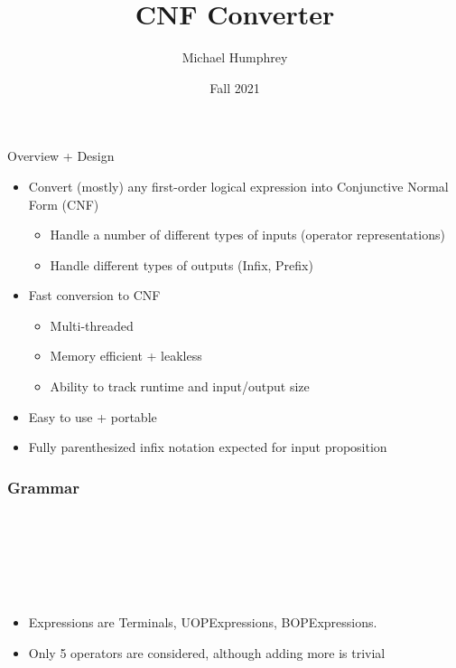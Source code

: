 \documentclass{beamer}
\title{CNF Converter}
\author{Michael Humphrey}
\institute{Colorado School of Mines}
\date{Fall 2021}
\begin{document}
\frame{\titlepage}

\begin{frame}{Overview + Design}
    \begin{itemize}
        \setlength\itemsep{1em}
        \item Convert (mostly) any first-order logical expression into Conjunctive Normal Form (CNF)
        \begin{itemize}
            \item Handle a number of different types of inputs (operator representations)
            \item Handle different types of outputs (Infix, Prefix)\\
        \end{itemize}   
        \item Fast conversion to CNF
        \begin{itemize}
            \item Multi-threaded
            \item Memory efficient + leakless
            \item Ability to track runtime and input/output size
        \end{itemize}
        \item Easy to use + portable
        \item Fully parenthesized infix notation expected for input proposition
    \end{itemize}
\end{frame}

\begin{frame}
\frametitle{Grammar}
\begin{grammar}
    \\
        \\
        \\
    \\
    \\
\end{grammar}

\begin{itemize}
    \item Expressions are Terminals, UOPExpressions, BOPExpressions.
    \item Only 5 operators are considered, although adding more is trivial

\end{itemize}
\end{frame}
\end{document}
